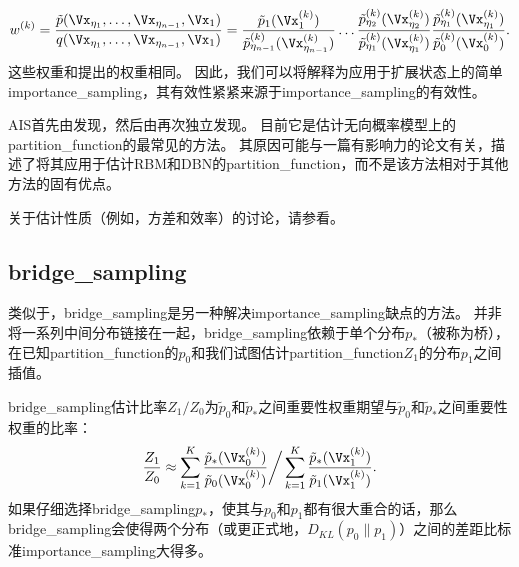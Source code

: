 \begin{equation}
	w^{(k)} = \frac{ \tilde{p}(\Vx_{\eta_1}, \dots, \Vx_{\eta_{n-1}}, \Vx_1) }{ q( \Vx_{\eta_1}, \dots, \Vx_{\eta_{n-1}}, \Vx_1 ) } =
\frac{ \tilde{p}_1(\Vx_1^{(k)}) }{ \tilde{p}_{\eta_{n-1}}^{(k)}(\Vx_{\eta_{n-1}}^{(k)}) } \dots
\frac{ \tilde{p}_{\eta_{2}}^{(k)}(\Vx_{\eta_{2}}^{(k)}) }{ \tilde{p}_{\eta_1}^{(k)}(\Vx_{\eta_{1}}^{(k)}) } 
\frac{ \tilde{p}_{\eta_{1}}^{(k)}(\Vx_{\eta_{1}}^{(k)}) }{ \tilde{p}_{0}^{(k)}(\Vx_{0}^{(k)}) } .
\end{equation}
这些权重和提出的权重相同。
因此，我们可以将解释为应用于扩展状态上的简单\gls{importance_sampling}，其有效性紧紧来源于\gls{importance_sampling}的有效性。


\gls{AIS}首先由\cite{Jarzynski1997}发现，然后由\cite{Neal-2001}再次独立发现。
目前它是估计无向概率模型上的\gls{partition_function}的最常见的方法。
其原因可能与一篇有影响力的论文\citep{Salakhutdinov+Murray-2008}有关，描述了将其应用于估计\gls{RBM}和\gls{DBN}的\gls{partition_function}，而不是该方法相对于其他方法的固有优点。


关于估计性质（例如，方差和效率）的讨论，请参看\cite{Neal-2001}。


\subsection{\gls{bridge_sampling}}
\label{subsec:bridge_sampling}
类似于，\gls{bridge_sampling}\citep{Bennet76}是另一种解决\gls{importance_sampling}缺点的方法。
并非将一系列中间分布链接在一起，\gls{bridge_sampling}依赖于单个分布$p_*$（被称为桥），在已知\gls{partition_function}的$p_0$和我们试图估计\gls{partition_function}$Z_1$的分布$p_1$之间插值。


\gls{bridge_sampling}估计比率$Z_1 / Z_0$为$\tilde{p}_0$和$\tilde{p}_*$之间重要性权重期望与$\tilde{p}_0$和$\tilde{p}_*$之间重要性权重的比率：
\begin{equation}
	\frac{Z_1}{ Z_0} \approx \sum_{k=1}^K \frac{ \tilde{p}_*(\Vx_0^{(k)}) }{ \tilde{p}_0(\Vx_0^{(k)}) } \bigg/ \sum_{k=1}^K \frac{ \tilde{p}_*(\Vx_1^{(k)}) }{ \tilde{p}_1(\Vx_1^{(k)}) } .
\end{equation}
如果仔细选择\gls{bridge_sampling}$p_*$，使其与$p_0$和$p_1$都有很大重合的话，那么\gls{bridge_sampling}会使得两个分布（或更正式地，$D_{KL}(p_0 \| p_1)$）之间的差距比标准\gls{importance_sampling}大得多。


